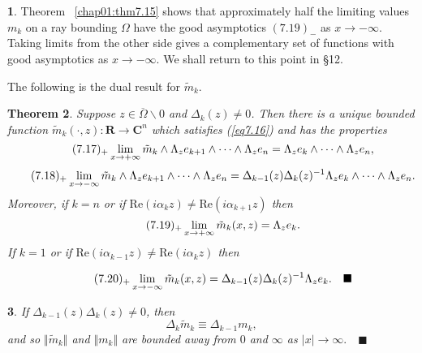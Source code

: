 \documentclass{surv-l}
\theoremstyle{plain}
\newtheorem{theorem}{Theorem}[section]
\newtheorem{cor}[theorem]{\sc{Corollary}}
\theoremstyle{definition}
\newtheorem{remark}[theorem]{\sc{Remark}}
\numberwithin{equation}{chapter}
\begin{document}
\setcounter{theorem}{22}
\begin{remark} Theorem ~\ref{chap01:thm7.15} shows that approximately half the limiting values $m_{k}$ on a ray bounding $\Omega$ have the good asymptotics $(7.19)_{-}$ as $ x\rightarrow-\infty$. Taking limits from the other side gives a complementary set of functions with good asymptotics as $ x\rightarrow-\infty$. We shall return to this point in \S12.
\end{remark}
The following is the dual result for $\tilde{m}_{k}$.
\begin{theorem}\label{thm7.24}
Suppose $z\in\overline{\Omega}\backslash 0$ and $\Delta_{k}(z)\neq
0$. Then there is a unique bounded function $\tilde{m}_{k}(\cdot, z) : \mathbf{R}\rightarrow \mathbf{C}^{n}$ which satisfies \emph{(\ref{eq7.16})} and has the properties
\begin{equation*}
\tag*{$(7.17)_{+}$} \displaystyle \lim_{x\rightarrow+\infty} \tilde{m}_{k}\wedge\Lambda_{z}e_{k+1}\wedge\cdots\wedge\Lambda_{z}e_{n}=\Lambda_{z}e_{k}\wedge\cdots\wedge\Lambda_{z}e_{n},
\end{equation*}
\begin{equation*}
\tag*{$(7.18)_{+}$} \displaystyle \lim_{x\rightarrow-\infty} \tilde{m}_{k}\wedge\Lambda_{z}e_{k+1}\wedge\cdots\wedge\Lambda_{z}e_{n}=\Delta_{k-1}(z)\Delta_{k}(z)^{-1}\Lambda_{z}e_{k}\wedge\cdots\wedge\Lambda_{z}e_{n}.
\end{equation*}
Moreover, if $k=n$ or if $\mathrm{Re}(i\alpha_{k}z)\neq\mathrm{Re}(i\alpha_{k+1}z)$ then
\begin{equation*}
\tag*{$(7.19)_{+}$} \displaystyle \lim_{x\rightarrow+\infty} \tilde{m}_{k}(x, z)=\Lambda_{z}e_{k}.
\end{equation*}
If $k=1$ or if $\mathrm{Re}(i\alpha_{k-1}z)\neq\mathrm{Re}(i\alpha_{k}z)$ then

\begin{equation*}
\tag*{$(7.20)_{+}$} \displaystyle \lim_{x\rightarrow-\infty} \tilde{m}_{k}(x, z)=\Delta_{k-1}(z)\Delta_{k}(z)^{-1}\Lambda_{z}e_{k}.\quad \blacksquare
\end{equation*}
\end{theorem}
\setcounter{theorem}{24}
\begin{cor}\label{coro7.25}
If $\Delta_{k-1}(z)\Delta_{k}(z)\neq 0$, then
\setcounter{equation}{25}
\begin{equation}\label{eq7.26}
\Delta_{k}\tilde{m}_{k}\equiv\Delta_{k-1} m_{k},
\end{equation}
and so $\Vert\tilde{m}_{k}\Vert$ and $\Vert m_{k}\Vert$ are bounded away from $0$ and $\infty$ as $|x|\rightarrow\infty.\quad \blacksquare$
\end{cor}
\end{document}
